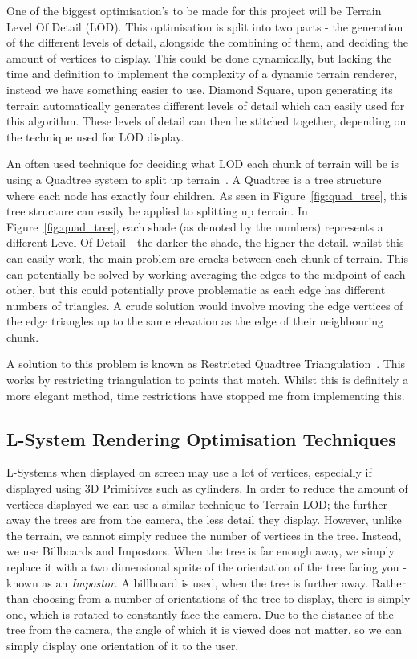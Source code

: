 \documentclass[a4paper,10pt]{report}
\begin{document}
One of the biggest optimisation's to be made for this project will be Terrain Level Of Detail (LOD). This optimisation is split into two parts - the generation of the different levels of detail, alongside the combining of them, and deciding the amount of vertices to display. This could be done dynamically, but lacking the time and definition  to implement the complexity of a dynamic terrain renderer, instead we have something easier to use. Diamond Square, upon generating its terrain automatically generates different levels of detail which can easily used for this algorithm. These levels of detail can then be stitched together, depending on the technique used for LOD display. \medskip

An often used technique for deciding what LOD each chunk of terrain will be is using a Quadtree system to split up terrain~\cite{pajarola1998large}. A Quadtree is a tree structure where each node has exactly four children. As seen in Figure~\ref{fig:quad_tree}, this tree structure can easily be applied to splitting up terrain. In Figure~\ref{fig:quad_tree}, each shade (as denoted by the numbers) represents a different Level Of Detail - the darker the shade, the higher the detail. whilst this can easily work, the main problem are cracks between each chunk of terrain. This can potentially be solved by working averaging the edges to the midpoint of each other, but this could potentially prove problematic as each edge has different numbers of triangles. A crude solution would involve moving the edge vertices of the edge triangles up to the same elevation as the edge of their neighbouring chunk. \medskip

A solution to this problem is known as Restricted Quadtree Triangulation~\cite{pajarola1998large}. This works by restricting triangulation to points that match. Whilst this is definitely a more elegant method, time restrictions have stopped me from implementing this. 

\subsection{L-System Rendering Optimisation Techniques}
L-Systems when displayed on screen may use a lot of vertices, especially if displayed using 3D Primitives such as cylinders. In order to reduce the amount of vertices displayed we can use a similar technique to Terrain LOD; the further away the trees are from the camera, the less detail they display. However, unlike the terrain, we cannot simply reduce the number of vertices in the tree. Instead, we use Billboards and Impostors. When the tree is far enough away, we simply replace it with a two dimensional sprite of the orientation of the tree facing you - known as an \textit{Impostor}. A billboard is used, when the tree is further away. Rather than choosing from a number of orientations of the tree to display, there is simply one, which is rotated to constantly face the camera. Due to the distance of the tree from the camera, the angle of which it is viewed does not matter, so we can simply display one orientation of it to the user.
\end{document}

